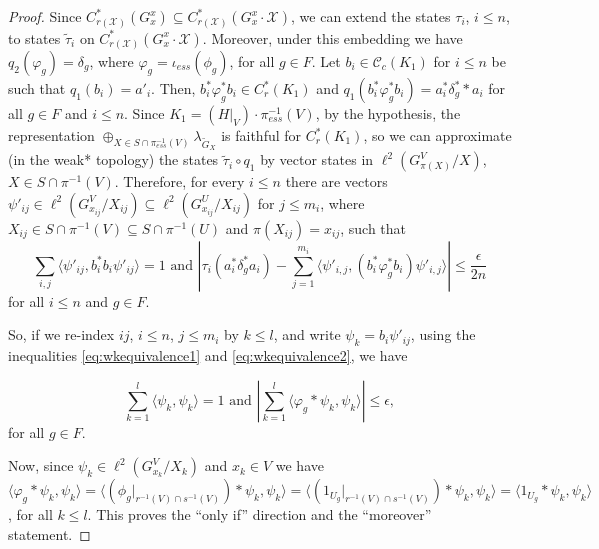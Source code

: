 \documentclass[a4paper, 12pt]{amsart}
\theoremstyle{definition}
\theoremstyle{remark}
\numberwithin{equation}{section}
\begin{document}
\begin{proof}
Since $C^{*}_{r(\mathcal{X})}(G^{x}_{x})\subseteq C^{*}_{r(\mathcal{X})}(G^{x}_{x}\cdot\mathcal{X})$, we can extend the states $\tau_{i}$, $i\leq n$, to states $\tilde{\tau}_{i}$ on  $C^{*}_{r(\mathcal{X})}(G^{x}_{x}\cdot\mathcal{X})$. Moreover, under this embedding we have $q_{2}(\varphi_{g}) = \delta_{g}$, where $\varphi_{g} = \iota_{ess}(\phi_{g})$, for all $g\in F$. Let $b_{i}\in \mathscr{C}_{c}(K_{1})$ for $i\leq n$ be such that $q_{1}(b_{i}) = a'_{i}$. Then, $b^{*}_{i}\varphi^{*}_{g}b_{i}\in C^{*}_{r}(K_{1})$ and $q_{1}(b^{*}_{i}\varphi^{*}_{g}b_{i}) = a^{*}_{i}\delta^{*}_{g}*a_{i}$ for all $g\in F$ and $i\leq n$. Since $K_{1} = (H|_{V})\cdot \pi_{ess}^{-1}(V)$, by the hypothesis, the representation $\oplus_{X\in S\cap\pi_{ess}^{-1}(V)}\lambda_{\tilde{G}_{X}}$ is faithful for $C^{*}_{r}(K_{1})$, so we can approximate (in the weak* topology) the states $\tilde{\tau}_{i}\circ q_{1}$ by vector states in $\ell^{2}(G^{V}_{\pi(X)}/X)$, $X\in S\cap \pi^{-1}(V)$. Therefore, for every $i\leq n$ there are vectors $\psi'_{ij}\in \ell^{2}(G^{V}_{x_{ij}}/X_{ij})\subseteq \ell^{2}(G^{U}_{x_{ij}}/X_{ij})$ for $j\leq m_{i}$, where $X_{ij}\in S\cap\pi^{-1}(V)\subseteq S\cap \pi^{-1}(U)$ and $\pi(X_{ij}) = x_{ij}$, such that 
\begin{equation}
\label{eq:wkequivalence2}
    \sum_{i,j}\langle \psi'_{ij}, b_{i}^{*}b_{i}\psi'_{ij}\rangle = 1 \text{ and } |\tau_{i}(a^{*}_{i}\delta^{*}_{g}a_{i}) - \sum^{m_{i}}_{j=1}\langle \psi'_{i,j}, (b_{i}^{*}\varphi^{*}_{g}b_{i})\psi'_{i,j}\rangle|\leq \frac{\epsilon}{2n}
\end{equation}
for all $i\leq n$ and $g\in F$.

So, if we re-index $ij$, $i\leq n$, $j\leq m_{i}$ by $k\leq l$, and write $\psi_{k} = b_{i}\psi'_{ij}$, using the inequalities \ref{eq:wkequivalence1} and \ref{eq:wkequivalence2}, we have 

$$\sum^{l}_{k=1}\langle \psi_{k},\psi_{k}\rangle = 1 \text{ and } |\sum^{l}_{k=1}\langle \varphi_{g}*\psi_{k}, \psi_{k}\rangle |\leq \epsilon,$$
for all $g\in F$.

Now, since $\psi_{k}\in \ell^{2}(G^{V}_{x_{k}}/X_{k})$ and $x_{k}\in V$ we have  $\langle \varphi_{g}*\psi_{k}, \psi_{k}\rangle = \langle (\phi_{g}|_{r^{-1}(V)\cap s^{-1}(V)})*\psi_{k}, \psi_{k}\rangle = \langle (1_{U_{g}}|_{r^{-1}(V)\cap s^{-1}(V)})*\psi_{k}, \psi_{k}\rangle = \langle 1_{U_{g}}*\psi_{k}, \psi_{k}\rangle $, for all $k\leq l$. This proves the ``only if'' direction and the ``moreover'' statement.



\end{proof}
\end{document}
